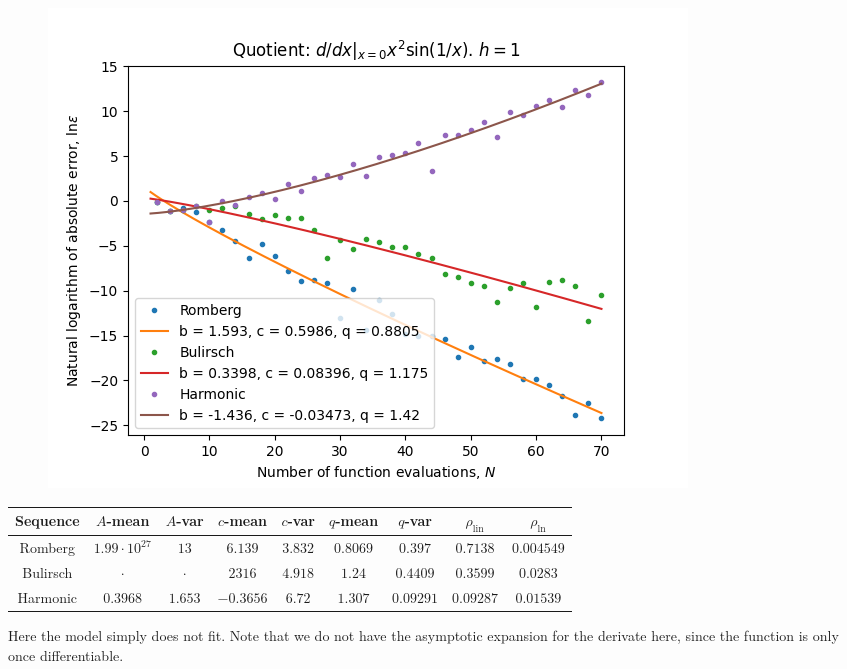 \begin{figure}[H]
\centering
\begin{minipage}{0.45\textwidth}
\centering
\includegraphics[scale=0.45]{../results/diff_quot_plots/xsin_hp_trend.png}
\end{minipage}
\end{figure}

\begin{table}[H]
    \centering
    \small
    \small
    \begin{tabular}{c||c|c|c|c|c|c|c|c}
Sequence & \(A\)-mean & \(A\)-var & \(c\)-mean & \(c\)-var & \(q\)-mean & \(q\)-var & \(\rho_{\operatorname{lin}}\)& \(\rho_{\ln}\)\\\hline
\rowcolor{red}
Romberg & \(1.99\cdot 10^{27}\) & \(13\) & \(6.139\) & \(3.832\) & \(0.8069\) & \(0.397\) & \(0.7138\) & \(0.004549\) \\
\rowcolor{red}
Bulirsch & \(\cdot\) & \(\cdot\) & \(2316\) & \(4.918\) & \(1.24\) & \(0.4409\) & \(0.3599\) & \(0.0283\) \\
\rowcolor{red}
Harmonic & \(0.3968\) & \(1.653\) & \(-0.3656\) & \(6.72\) & \(1.307\) & \(0.09291\) & \(0.09287\) & \(0.01539\) \\
    \end{tabular}
    \label{tab:my_label}
\end{table}

Here the model simply does not fit. Note that we do not have the asymptotic expansion for the derivate here, since the function is only once differentiable.\\